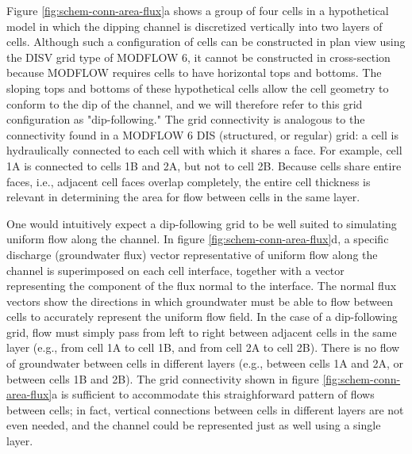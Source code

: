 \documentclass{article}
\begin{document}
Figure \ref{fig:schem-conn-area-flux}a shows a group of four cells in a hypothetical model in which the dipping channel is discretized vertically into two layers of cells. Although such a configuration of cells can be constructed in plan view using the DISV grid type of MODFLOW 6, it cannot be constructed in cross-section because MODFLOW requires cells to have horizontal tops and bottoms. The sloping tops and bottoms of these hypothetical cells allow the cell geometry to conform to the dip of the channel, and we will therefore refer to this grid configuration as "dip-following." The grid connectivity is analogous to the connectivity found in a MODFLOW 6 DIS (structured, or regular) grid: a cell is hydraulically connected to each cell with which it shares a face. For example, cell 1A is connected to cells 1B and 2A, but not to cell 2B. Because cells share entire faces, i.e., adjacent cell faces overlap completely, the entire cell thickness is relevant in determining the area for flow between cells in the same layer.

One would intuitively expect a dip-following grid to be well suited to simulating uniform flow along the channel. In figure \ref{fig:schem-conn-area-flux}d, a specific discharge (groundwater flux) vector representative of uniform flow along the channel is superimposed on each cell interface, together with a vector representing the component of the flux normal to the interface. The normal flux vectors show the directions in which groundwater must be able to flow between cells to accurately represent the uniform flow field. In the case of a dip-following grid, flow must simply pass from left to right between adjacent cells in the same layer (e.g., from cell 1A to cell 1B, and from cell 2A to cell 2B). There is no flow of groundwater between cells in different layers (e.g., between cells 1A and 2A, or between cells 1B and 2B). The grid connectivity shown in figure \ref{fig:schem-conn-area-flux}a is sufficient to accommodate this straighforward pattern of flows between cells; in fact, vertical connections between cells in different layers are not even needed, and the channel could be represented just as well using a single layer.
\end{document}
